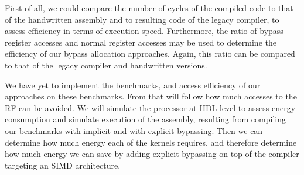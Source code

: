 First of all, we could compare the number of cycles of the compiled code to that of the handwritten assembly and to resulting code of the legacy compiler, to assess efficiency in terms of execution speed. Furthermore, the ratio of bypass register accesses and normal register accesses may be used to determine the efficiency of our bypass allocation approaches. Again, this ratio can be compared to that of the legacy compiler and handwritten versions.

We have yet to implement the benchmarks, and access efficiency of our approaches on these benchmarks. From that will follow how much accesses to the RF can be avoided. We will simulate the processor at HDL level to assess energy consumption and simulate execution of the assembly, resulting from compiling our benchmarks with implicit and with explicit bypassing. Then we can determine how much energy each of the kernels requires, and therefore determine how much energy we can save by adding explicit bypassing on top of the compiler targeting an SIMD architecture. 